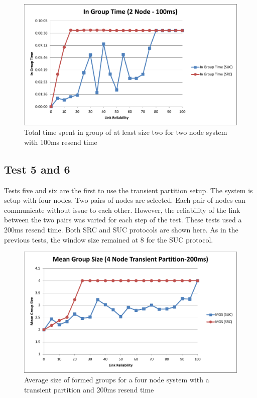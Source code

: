 \documentclass{llncs}
\begin{document}
\begin{figure}[!h]
\centering
\includegraphics[width=.74\textwidth]{IGT-2NODE-100.pdf}
\caption{Total time spent in group of at least size two for two node system with 100ms resend time}
\label{fig:IGT-2NODE-100}
\end{figure}

\subsection{Test 5 and 6}

Tests five and six are the first to use the transient partition setup. The system is setup with four nodes. Two pairs of nodes are selected. Each pair of nodes can communicate without issue to each other. However, the reliability of the link between the two pairs was varied for each step of the test. These tests used a 200ms resend time. Both SRC and SUC protocols are shown here. As in the previous tests, the window size remained at 8 for the SUC protocol.

\begin{figure}[!h]
\centering
\includegraphics[width=.74\textwidth]{MGS-TRANS-200.pdf}
\caption{Average size of formed groups for a four node system with a transient partition and 200ms resend time}
\label{fig:MGS-TRANS-200}
\end{figure}
\end{document}
